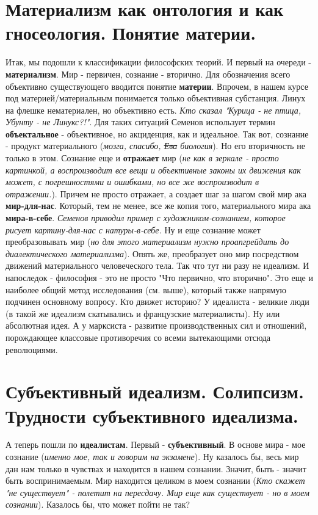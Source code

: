 \section{ Материализм как онтология и как гносеология. Понятие материи.}
Итак, мы подошли к классификации философских теорий. И первый на очереди - \textbf{материализм}. Мир - первичен, сознание - вторично. Для обозначения всего объективно существующего вводится понятие \textbf{материи}. Впрочем, в нашем курсе под материей/материальным понимается только объективная субстанция. Линух на флешке нематериален, но объективно есть. \textit{Кто сказал "Курица - не птица, Убунту - не Линукс?!"}. Для таких ситуаций Семенов использует термин \textbf{объектальное} - объективное, но акциденция, как и идеальное. Так вот, сознание - продукт материального (\textit{мозга, спасибо, \sout{Ева} биология}). Но его вторичность не только в этом. Сознание еще и \textbf{отражает} мир (\textit{не как в зеркале - просто картинкой, а воспроизводит все вещи и объективные законы их движения как может, с погрешностями и ошибками, но все же воспроизводит в отражении.}). Причем не просто отражает, а создает шаг за шагом свой мир ака \textbf{мир-для-нас}. Который, тем не менее, все же копия того, материального мира ака \textbf{мира-в-себе}. \textit{Семенов приводил пример с художником-сознанием, которое рисует картину-для-нас с натуры-в-себе.} Ну и еще сознание
может преобразовывать мир (\textit{но для этого материализм нужно проапгрейдить до диалектического материализма}). Опять же, преобразует оно мир посредством движений материального человеческого тела. Так что тут ни разу не идеализм. И напоследок - философия - это не просто "Что первично, что вторично". Это еще и наиболее общий метод исследования (см. выше), который также напрямую подчинен основному вопросу. Кто движет историю? У идеалиста - великие люди (в такой же идеализм скатывались и французские материалисты). Ну или абсолютная идея. А у марксиста - развитие производственных сил и отношений, порождающее классовые противоречия со всеми вытекающими отсюда революциями. 

\section{ Субъективный идеализм. Солипсизм. Трудности субъективного идеализма.}
А теперь пошли по \textbf{идеалистам}. Первый - \textbf{субъективный}. В основе мира - мое сознание (\textit{именно мое, так и говорим на экзамене}). Ну казалось бы, весь мир дан нам только в чувствах и находится в нашем сознании. Значит, быть - значит быть воспринимаемым. Мир находится целиком в моем сознании (\textit{Кто скажет "не существует" - полетит на пересдачу. Мир еще как существует - но в моем сознании}). Казалось бы, что может пойти не так? 

